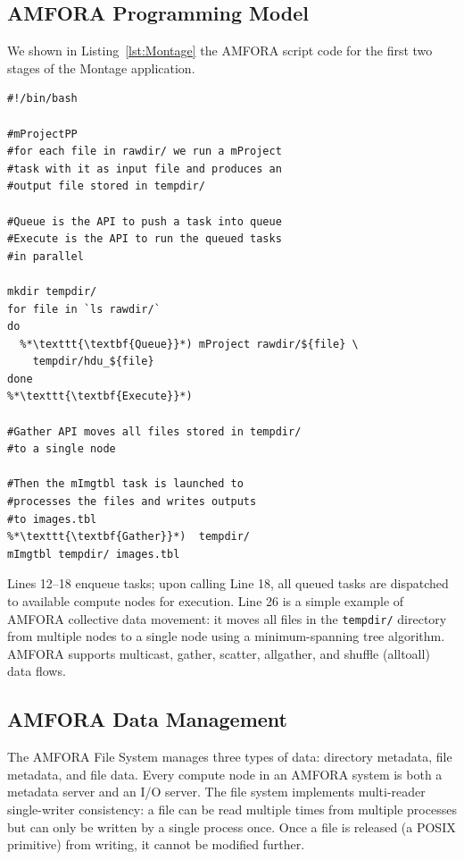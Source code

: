 \documentclass{sig-alternate}
\begin{document}
\subsection{AMFORA Programming Model}
We shown in Listing~\ref{lst:Montage} the AMFORA script code for the first two stages of the Montage application.
\begin{lstlisting}[label=lst:Montage, caption=Parallel Script for Montage, xleftmargin=2.5ex]
#!/bin/bash

#mProjectPP
#for each file in rawdir/ we run a mProject 
#task with it as input file and produces an 
#output file stored in tempdir/

#Queue is the API to push a task into queue
#Execute is the API to run the queued tasks 
#in parallel

mkdir tempdir/
for file in `ls rawdir/`
do
  %*\texttt{\textbf{Queue}}*) mProject rawdir/${file} \
    tempdir/hdu_${file}
done
%*\texttt{\textbf{Execute}}*) 

#Gather API moves all files stored in tempdir/ 
#to a single node

#Then the mImgtbl task is launched to
#processes the files and writes outputs 
#to images.tbl
%*\texttt{\textbf{Gather}}*)  tempdir/
mImgtbl tempdir/ images.tbl 	    
\end{lstlisting}

Lines 12--18 enqueue tasks; upon calling Line 18, all queued tasks are dispatched
to available compute nodes for execution. Line 26 is a simple example of AMFORA collective data movement:
it moves all files in the {\tt tempdir/} directory from multiple nodes to a single node using a minimum-spanning tree algorithm.
AMFORA supports multicast, gather, scatter, allgather, and shuffle (alltoall) data flows.

\subsection{AMFORA Data Management}
The AMFORA File System manages three types of data: directory metadata, file metadata, and file data.
Every compute node in an AMFORA system is both a metadata server and an I/O server. 
The file system implements multi-reader single-writer consistency: a file can be read multiple times from multiple processes but can only be written by a single process once. Once a file is released (a POSIX primitive) from writing, it cannot be modified further. 
\end{document}
